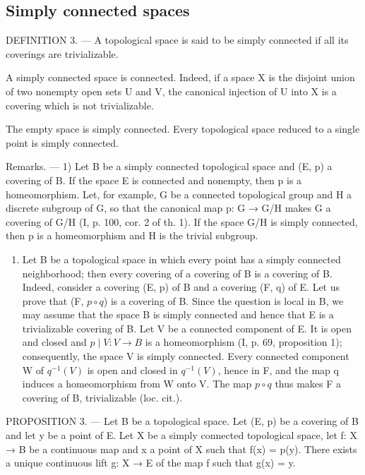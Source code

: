 \subsection{Simply connected spaces}

DEFINITION 3. --- A topological space is said to be simply connected if all its coverings are trivializable.

A simply connected space is connected. Indeed, if a space X is the disjoint union of two nonempty open sets U and V, the canonical injection of U into X is a covering which is not trivializable.

The empty space is simply connected. Every topological space reduced to a single point is simply connected.

Remarks. --- 1) Let B be a simply connected topological space and (E, p) a covering of B. If the space E is connected and nonempty, then p is a homeomorphism. Let, for example, G be a connected topological group and H a discrete subgroup of G, so that the canonical map p: G → G/H makes G a covering of G/H (I, p. 100, cor. 2 of th. 1). If the space G/H is simply connected, then p is a homeomorphism and H is the trivial subgroup.

\begin{enumerate}
\def\labelenumi{\arabic{enumi})}
\setcounter{enumi}{1}
\tightlist
\item
  Let B be a topological space in which every point has a simply connected neighborhood; then every covering of a covering of B is a covering of B. Indeed, consider a covering (E, p) of B and a covering (F, q) of E. Let us prove that (F, \(p \circ q\)) is a covering of B. Since the question is local in B, we may assume that the space B is simply connected and hence that E is a trivializable covering of B. Let V be a connected component of E. It is open and closed and \(p \mid V: V \to B\) is a homeomorphism (I, p. 69, proposition 1); consequently, the space V is simply connected. Every connected component W of \(q^{-1}(V)\) is open and closed in \(q^{-1}(V)\), hence in F, and the map q induces a homeomorphism from W onto V. The map \(p \circ q\) thus makes F a covering of B, trivializable (loc. cit.).
\end{enumerate}

PROPOSITION 3. --- Let B be a topological space. Let (E, p) be a covering of B and let y be a point of E. Let X be a simply connected topological space, let f: X → B be a continuous map and x a point of X such that f(x) = p(y). There exists a unique continuous lift g: X → E of the map f such that g(x) = y.

